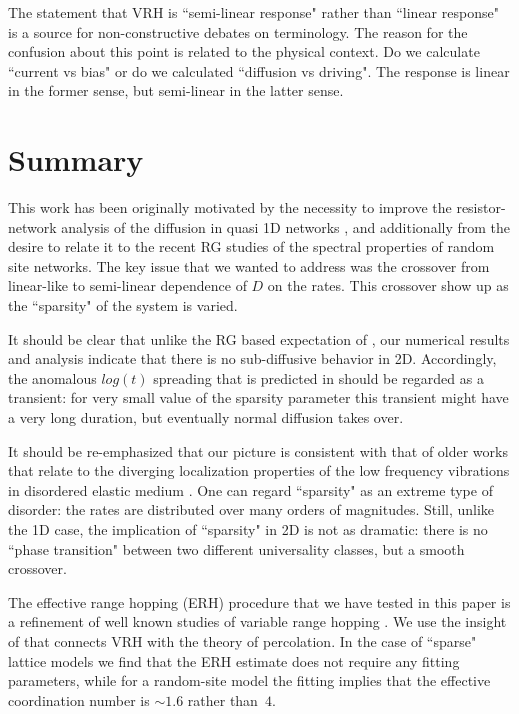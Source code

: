 \documentclass[onecolumn,fleqn,12pt,openany,draft]{book}
\begin{document}
The statement that VRH is ``semi-linear response" rather than ``linear response"
is a source for non-constructive debates on terminology. The reason for the 
confusion about this point is related to the physical context. 
Do we calculate ``current vs bias" or do we calculated ``diffusion vs driving".
The response is linear in the former sense, but semi-linear in the latter sense.


\section{Summary}

This work has been originally motivated by the necessity 
to improve the resistor-network analysis of the diffusion 
in quasi 1D networks \cite{kbd}, and additionally from the 
desire to relate it to the recent RG studies \cite{amir} 
of the spectral properties of random site networks.
The key issue that we wanted to address was 
the crossover from linear-like to semi-linear dependence 
of $D$ on the rates. This crossover show up as the ``sparsity" 
of the system is varied. 

It should be clear that unlike the RG based expectation 
of \cite{amir}, our numerical results and analysis 
indicate that there is no sub-diffusive behavior in 2D.
Accordingly, the anomalous $log(t)$ spreading that is 
predicted in \cite{amir} should be regarded as a transient: 
for very small value of the sparsity parameter this transient 
might have a very long duration, but eventually normal diffusion  
takes over. 

It should be re-emphasized that our picture 
is consistent with that of older works 
that relate to the diverging localization properties 
of the low frequency vibrations 
in disordered elastic medium \cite{loc}. 
%
One can regard ``sparsity" as an extreme type of disorder:
the rates are distributed over many orders of magnitudes.
Still, unlike the 1D case, the implication of ``sparsity" 
in 2D is not as dramatic: there is no ``phase transition" 
between two different universality classes, but a smooth crossover.

The effective range hopping (ERH) procedure that we have tested 
in this paper is a refinement of well known studies of variable 
range hopping \cite{mott,miller,AHL,Halp,pollak,VRHbook}.
We use the insight of \cite{AHL,Halp,pollak} that connects VRH 
with the theory of percolation. In the case of ``sparse"  
lattice models we find that the ERH estimate does not require 
any fitting parameters, while for a random-site model 
the fitting implies that the effective coordination number 
is $\sim1.6$ rather than~$4$. 
\end{document}
